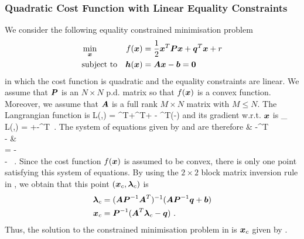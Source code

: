 \subsubsection{Quadratic Cost Function with Linear Equality Constraints}
We consider the following equality constrained minimisation problem
\begin{gather}
  \begin{alignedat}{2}
      &\min_{\boldsymbol{x}} &\quad f(\boldsymbol{x}) &= \frac{1}{2}\boldsymbol{x}^T\boldsymbol{Px}+\boldsymbol{q}^T\boldsymbol{x}+r\\
      &\text{subject to}&\quad \boldsymbol{h}(\boldsymbol{x}) &= \boldsymbol{Ax}-\boldsymbol{b}=\boldsymbol{0}
  \end{alignedat}
  \label{eq:constr_opt_quad_lin}
\end{gather}
in which the cost function is quadratic and the equality constraints are linear. We assume that $\boldsymbol{P}$ is an $N\times N$ p.d. matrix so that $f(\boldsymbol{x})$ is a convex function. Moreover, we assume that $\boldsymbol{A}$ is a full rank $M\times N$ matrix with $M\leq N$. The Langrangian function is 
\bmath
  L(,\vect{\lambda}) = ^T+^T+ - \vect{\lambda}^T(-)
\emath
and its gradient w.r.t. $\boldsymbol{x}$ is
\bmath
  \vect{\nabla}_{} L(,\vect{\lambda}) = +-^T\vect{\lambda}\ .
\emath
The system of equations given by  and  are therefore
\bmath
  \bbmtx
      & -^T\\
    - &  
  \ebmtx
  \bbmtx
    \\
    \vect{\lambda}
  \ebmtx = 
  \bbmtx
    -\\
    -
  \ebmtx\ .
\emath
Since the cost function $f(\boldsymbol{x})$ is assumed to be convex, there is only one point satisfying this system of equations. By using the $2\times 2$ block matrix inversion rule in , we obtain that this point $(\boldsymbol{x}_c,\boldsymbol{\lambda}_c)$ is
\begin{align}
  \vect{\lambda}_c &= (\vect{AP}^{-1}\vect{A}^T)^{-1}(\vect{AP}^{-1}\vect{q}+\vect{b})\label{eq:constr_opt_quad_lin_minlam}\\
  \vect{x}_c &= \vect{P}^{-1}(\vect{A}^T\vect{\lambda}_c-\vect{q})\ .
  \label{eq:constr_opt_quad_lin_minx}
\end{align}
Thus, the solution to the constrained minimisation problem in  is $\boldsymbol{x}_c$ given by .

